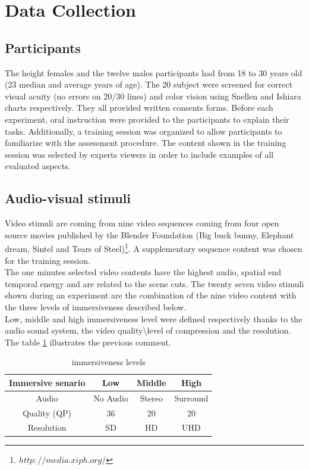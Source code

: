 \section{Data Collection}

\subsection{Participants}
The height females and the twelve males participants had from 18 to 30 years old (23 median and average years of age). The 20 subject were screened for correct visual acuity (no errors on 20/30 lines) and color vision using Snellen and Ishiara charts respectively. They all provided written consents forms. Before each experiment, oral instruction were provided to the participants to explain their tasks. Additionally, a training session was organized to allow participants to familiarize with the assessment procedure. The content shown in the training session was selected by experts viewers in order to include examples of all evaluated aspects.

\subsection{Audio-visual stimuli}
Video stimuli are coming from nine video sequences coming from four open source movies published by the Blender Foundation (Big buck bunny, Elephant dream, Sintel and Tears of Steel)\footnote{$http://media.xiph.org/$}. A supplementary sequence content was chosen for the training session.
\\The one minutes selected video contents have the highest audio, spatial end temporal energy and are related to the scene cuts.
The twenty seven video stimuli shown during an experiment are the combination of the nine video content with the three levels of immersiveness described below.
\\Low, middle and high immersiveness level were defined respectively thanks to the audio sound system, the video quality\textbackslash level of compression and the resolution.
The table \ref{IL} illustrates the previous comment.

\begin{table}[h]
\begin{tabular}{ |c || c | c | c | }
   \hline	
   Immersive senario 	& Low 			& Middle 		& High \\
   \hline	
   Audio 				& No Audio 		& Stereo		& Surround \\
   Quality (QP) 		& 36 			& 20			& 20 \\
   Resolution			& SD			& HD			& UHD\\
   \hline	
 \end{tabular}
 \caption{immersiveness levels}
 \label{IL}
 \end{table}

